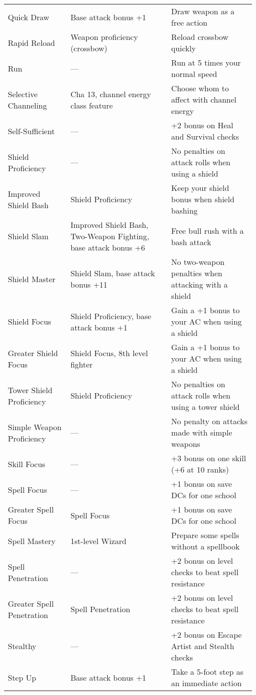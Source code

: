 \begin{table*}
\begin{tabularx}{\linewidth}{lXl}
Quick Draw & Base attack bonus +1 & Draw weapon as a free action\\
Rapid Reload & Weapon proficiency (crossbow) & Reload crossbow quickly\\
Run & --- & Run at 5 times your normal speed\\
Selective Channeling & Cha 13, channel energy class feature & Choose whom to affect with channel energy\\
Self-Sufficient & --- & +2 bonus on Heal and Survival checks\\
Shield Proficiency & --- & No penalties on attack rolls when using a shield\\
\enspace Improved Shield Bash & Shield Proficiency & Keep your shield bonus when shield bashing\\
\enspace \enspace Shield Slam & Improved Shield Bash, Two-Weapon Fighting, base attack bonus +6 & Free bull rush with a bash attack \\
\enspace \enspace \enspace Shield Master & Shield Slam, base attack bonus +11 & No two-weapon penalties when attacking with a shield\\
\enspace Shield Focus & Shield Proficiency, base attack bonus +1 & Gain a +1 bonus to your AC when using a shield\\
\enspace \enspace Greater Shield Focus & Shield Focus, 8th level fighter & Gain a +1 bonus to your AC when using a shield\\
\enspace Tower Shield Proficiency & Shield Proficiency & No penalties on attack rolls when using a tower shield\\
Simple Weapon Proficiency & --- & No penalty on attacks made with simple weapons\\
Skill Focus & --- & +3 bonus on one skill (+6 at 10 ranks)\\
Spell Focus & --- & +1 bonus on save DCs for one school\\
\enspace Greater Spell Focus & Spell Focus & +1 bonus on save DCs for one school\\
Spell Mastery & 1st-level Wizard & Prepare some spells without a spellbook\\
Spell Penetration & --- & +2 bonus on level checks to beat spell resistance\\
\enspace Greater Spell Penetration & Spell Penetration & +2 bonus on level checks to beat spell resistance\\
Stealthy & --- & +2 bonus on Escape Artist and Stealth checks\\
Step Up & Base attack bonus +1 & Take a 5-foot step as an immediate action\\

\end{tabularx}
\end{table*}
